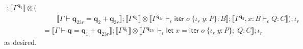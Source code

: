 \documentclass[acmsmall,screen,anonymous,review]{acmart}
\newcommand{\mb}[1]{\ensuremath{\mathbf{#1}}}
\newcommand{\ms}[1]{\ensuremath{\mathsf{#1}}}
\newcommand{\lto}{:}
\newcommand{\linr}[1]{\iota_r\;{#1}}
\newcommand{\letexpr}[3]{\ensuremath{\ms{let}\;#1 = #2;\;#3}}
\newcommand{\brb}[2]{\ms{br}\;#1\;#2}
\newcommand{\liter}[3]{\ms{iter}\;#1\;\{ \linr{#2} \lto #3 \}}
\newcommand{\qsp}[4]{#1 \vdash #2 = #3 + #4}
\newcommand{\rle}[1]{{\scriptsize\textsf{#1}}}
\newcommand{\hasty}[4]{#1 \vdash_{#2} #3: {#4}}
\newcommand{\haslb}[4]{#1 \vdash_{#2} #3 \rhd #4}
\newcommand{\ssalet}[3]{\ms{let}_{\ms{SSA}}\;#1 = #2; #3}
\newcommand{\dnt}[1]{\llbracket{#1}\rrbracket}
\newcommand{\zeroqv}[1]{#1^\uparrow}
\begin{document}
\begin{itemize}
\begin{align*}
      ; \dnt{\Gamma^{\mb{q}_1}} \otimes ( \\ & \qquad
        \dnt{\qsp{\Gamma}{\mb{q}_{23r}}{\mb{q}_{2}}{\mb{q}_{3r}}} 
        ; \dnt{\Gamma^{\mb{q}_2}} 
          \otimes \dnt{\hasty{\Gamma^{\mb{q}_{3r}}}{\epsilon}{\liter{o}{y}{P}}{B}}
        ; \dnt{\hasty{\Gamma^{\mb{q}_2}, x : B}{\epsilon}{Q}{C}}
      )
      ; \iota_r\\
  &= \dnt{\qsp{\Gamma}{\mb{q}}{\mb{q}_{1}}{\mb{q}_{23r}}}
      ; \dnt{\Gamma^{\mb{q}_1}} \otimes \dnt{
        \hasty{\Gamma^{\mb{q}_{23r}}}{\epsilon}{\letexpr{x}{\liter{o}{y}{P}}{Q}}{C}
      }
      ; \iota_r
  \end{align*}
  as desired.
\end{itemize}

\end{document}
